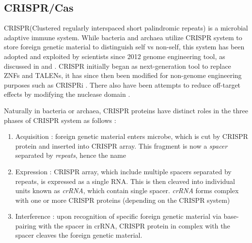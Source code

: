 \documentclass[11pt, oneside]{article}
\begin{document}
\subsection{CRISPR/Cas} \label{crisprintro}

CRISPR(Clustered regularly interspaced short palindromic repeats) is a microbial adaptive immune system. While bacteria and archaea utilize CRISPR system to store foreign genetic material to distinguish self vs non-self, this system has been adopted and exploited by scientists since 2012 genome engineering tool, as discussed in \cite{jenniferdoudna} and \cite{fengzhang}. CRISPR initially began as next-generation tool to replace ZNFs and TALENs, it has since then been modified for non-genome engineering purposes such as CRISPRi \cite{stanleyqi}. There also have been attempts to reduce off-target effects by modifying the nuclease domain\cite{doublenick} . 

Naturally in bacteria or archaea, CRISPR proteins have distinct roles in the three phases of CRISPR system as follows : 
\begin{enumerate}
\item Acquisition : foreign genetic material enters microbe, which is cut by CRISPR protein and inserted into CRISPR array. This fragment is now a \textit{spacer} separated by \textit{repeats}, hence the name
\item Expression : CRISPR array, which include multiple spacers separated by repeats, is expressed as a single RNA. This is then cleaved into individual units known as \textit{crRNA}, which contain single spacer. \textit{crRNA} forms complex with one or more CRISPR proteins (depending on the CRISPR system)
\item Interference : upon recognition of specific foreign genetic material via base-pairing with the spacer in crRNA, CRISPR protein in complex with the spacer cleaves the foreign genetic material. 
\end{enumerate}
\end{document}
